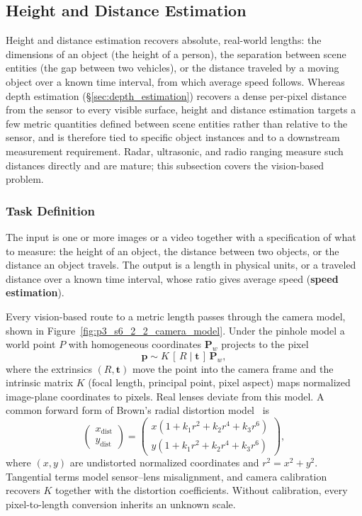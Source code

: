 
\subsection{Height and Distance Estimation}
\label{sec:height_distance}
Height and distance estimation recovers absolute, real-world lengths: the dimensions of an object (the height of a person), the separation between scene entities (the gap between two vehicles), or the distance traveled by a moving object over a known time interval, from which average speed follows.
Whereas depth estimation (\S\ref{sec:depth_estimation}) recovers a dense per-pixel distance from the sensor to every visible surface, height and distance estimation targets a few metric quantities defined between scene entities rather than relative to the sensor, and is therefore tied to specific object instances and to a downstream measurement requirement.
Radar, ultrasonic, and radio ranging measure such distances directly and are mature; this subsection covers the vision-based problem.

\subsubsection{Task Definition}
The input is one or more images or a video together with a specification of what to measure: the height of an object, the distance between two objects, or the distance an object travels. The output is a length in physical units, or a traveled distance over a known time interval, whose ratio gives average speed (\textbf{speed estimation}).

Every vision-based route to a metric length passes through the camera model, shown in Figure~\ref{fig:p3_s6_2_2_camera_model}. Under the pinhole model a world point $P$ with homogeneous coordinates $\mathbf{P}_w$ projects to the pixel
\begin{equation}
    \mathbf{p} \sim K\,[\,R \mid \mathbf{t}\,]\,\mathbf{P}_w,
\end{equation}
where the extrinsics $(R,\mathbf{t})$ move the point into the camera frame and the intrinsic matrix $K$ (focal length, principal point, pixel aspect) maps normalized image-plane coordinates to pixels. Real lenses deviate from this model. A common forward form of Brown's radial distortion model~\cite{brown1971close} is
\begin{equation}
    \begin{pmatrix} x_{\text{dist}} \\ y_{\text{dist}} \end{pmatrix} =
    \begin{pmatrix} x(1 + k_1 r^2 + k_2 r^4 + k_3 r^6) \\ y(1 + k_1 r^2 + k_2 r^4 + k_3 r^6) \end{pmatrix},
\end{equation}
where $(x,y)$ are undistorted normalized coordinates and $r^2=x^2+y^2$. Tangential terms model sensor--lens misalignment, and camera calibration~\cite{zhang2000flexible} recovers $K$ together with the distortion coefficients. Without calibration, every pixel-to-length conversion inherits an unknown scale.

